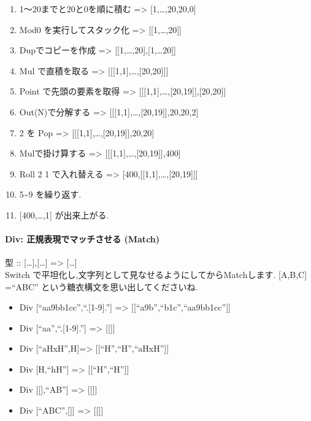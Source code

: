 \begin{enumerate}[1.]
\item
  1〜20までと20と0を順に積む =\textgreater{}
  {[}1,\ldots{},20,20,0{]}
\item
  Mod0 を実行してスタック化 =\textgreater{} {[}{[}1,\ldots{},20{]}{]}
\item
  Dupでコピーを作成 =\textgreater{}
  {[}{[}1,\ldots{},20{]},{[}1,\ldots{}20{]}{]}
\item
  Mul で直積を取る =\textgreater{}
  {[}{[}{[}1,1{]},\ldots{},{[}20,20{]}{]}{]}
\item
  Point で先頭の要素を取得 =\textgreater{}
  {[}{[}{[}1,1{]},\ldots{},{[}20,19{]}{]},{[}20,20{]}{]}
\item
  Out(N)で分解する =\textgreater{}
  {[}{[}{[}1,1{]},\ldots{},{[}20,19{]}{]},20,20,2{]}
\item
  2 を Pop =\textgreater{}
  {[}{[}{[}1,1{]},\ldots{},{[}20,19{]}{]},20,20{]}
\item
  Mulで掛け算する =\textgreater{}
  {[}{[}{[}1,1{]},\ldots{},{[}20,19{]}{]},400{]}
\item
  Roll 2 1 で入れ替える =\textgreater{}
  {[}400,{[}{[}1,1{]},\ldots{},{[}20,19{]}{]}{]}
\item
  5\textasciitilde{}9 を繰り返す.
\item
  {[}400,\ldots{},1{]} が出来上がる.
\end{enumerate}

\paragraph{Div: 正規表現でマッチさせる (Match)}

型 :: {[}\ldots{}{]},{[}\ldots{}{]} =\textgreater{}
{[}\ldots{}{]}\\Switch
で平坦化し,文字列として見なせるようにしてからMatchします. {[}A,B,C{]}
=``ABC'' という糖衣構文を思い出してくださいね.

\begin{itemize}
\item
  Div {[}``aa9bb1cc'',``.{[}1-9{]}.''{]} =\textgreater{}
  {[}{[}``a9b'',``b1c'',``aa9bb1cc''{]}{]}
\item
  Div {[}``aa'',``.{[}1-9{]}.''{]} =\textgreater{} {[}{[}{]}{]}
\item
  Div {[}``aHxH'',H{]}=\textgreater{} {[}{[}``H'',``H'',``aHxH''{]}{]}
\item
  Div {[}H,``h\textbar{}H''{]} =\textgreater{} {[}{[}``H'',``H''{]}{]}
\item
  Div {[}{[}{]},``A\textbar{}B''{]} =\textgreater{} {[}{[}{]}{]}
\item
  Div {[}``ABC'',{[}{]}{]} =\textgreater{} {[}{[}{]}{]}
\end{itemize}

